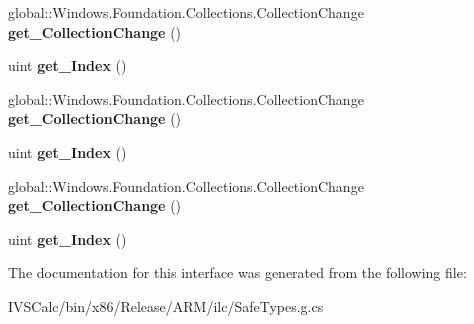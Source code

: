 \begin{DoxyCompactItemize}
global\+::\+Windows.\+Foundation.\+Collections.\+Collection\+Change {\bfseries get\+\_\+\+Collection\+Change} ()
\item 
\mbox{\label{interface_windows_1_1_foundation_1_1_collections_1_1_i_vector_changed_event_args_a7d5f41cfbb8fd4ca24e571ab4e56a8a5}} 
uint {\bfseries get\+\_\+\+Index} ()
\item 
\mbox{\label{interface_windows_1_1_foundation_1_1_collections_1_1_i_vector_changed_event_args_af7fb52152f8082c4af5d70cca45b3bb6}} 
global\+::\+Windows.\+Foundation.\+Collections.\+Collection\+Change {\bfseries get\+\_\+\+Collection\+Change} ()
\item 
\mbox{\label{interface_windows_1_1_foundation_1_1_collections_1_1_i_vector_changed_event_args_a7d5f41cfbb8fd4ca24e571ab4e56a8a5}} 
uint {\bfseries get\+\_\+\+Index} ()
\item 
\mbox{\label{interface_windows_1_1_foundation_1_1_collections_1_1_i_vector_changed_event_args_af7fb52152f8082c4af5d70cca45b3bb6}} 
global\+::\+Windows.\+Foundation.\+Collections.\+Collection\+Change {\bfseries get\+\_\+\+Collection\+Change} ()
\item 
\mbox{\label{interface_windows_1_1_foundation_1_1_collections_1_1_i_vector_changed_event_args_a7d5f41cfbb8fd4ca24e571ab4e56a8a5}} 
uint {\bfseries get\+\_\+\+Index} ()
\end{DoxyCompactItemize}


The documentation for this interface was generated from the following file\+:\begin{DoxyCompactItemize}
\item 
I\+V\+S\+Calc/bin/x86/\+Release/\+A\+R\+M/ilc/Safe\+Types.\+g.\+cs\end{DoxyCompactItemize}
